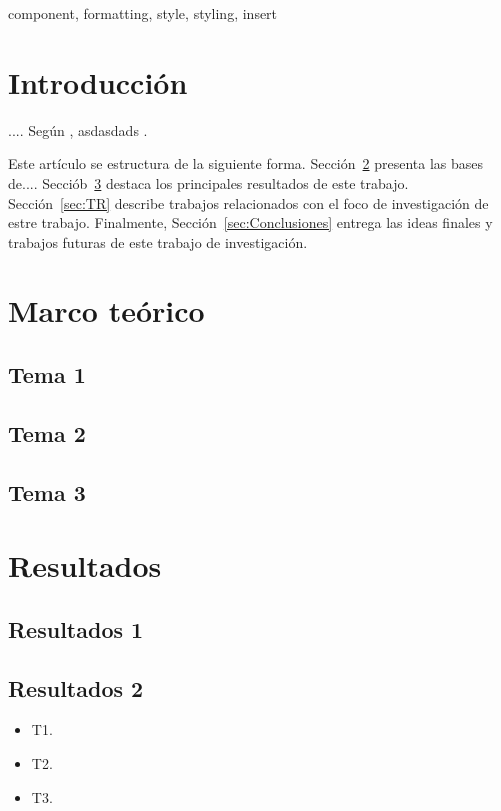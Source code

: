 \documentclass[conference]{IEEEtran}
\begin{document}
\begin{IEEEkeywords}
component, formatting, style, styling, insert
\end{IEEEkeywords}

\section{Introducción}
....
Según  \cite{Hebert2022}, asdasdads
.

Este artículo se estructura de la siguiente forma. Sección~\ref{sec:MT} presenta las bases de.... Secciób~\ref{sec:Res} destaca los principales resultados de este trabajo. Sección~\ref{sec:TR} describe trabajos relacionados con el foco de investigación de estre trabajo. Finalmente, Sección~\ref{sec:Conclusiones} entrega las ideas finales y trabajos futuras de este trabajo de investigación.

\section{Marco teórico} 
\label{sec:MT}
\subsection{Tema 1}

\subsection{Tema 2}

\subsection{Tema 3}

\section{Resultados}
\label{sec:Res}
\subsection{Resultados 1}

\subsection{Resultados 2}

\begin{itemize}
\item T1.
\item T2.
\item T3.
\end{itemize}
\end{document}
